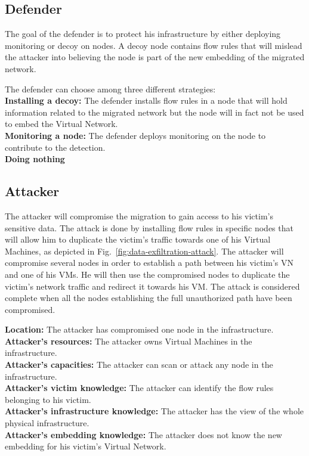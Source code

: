 \subsection{Defender}
The goal of the defender is to protect his infrastructure by either deploying monitoring or decoy on nodes. A decoy node contains flow rules that will mislead the attacker into believing the node is part of the new embedding of the migrated network.

The defender can choose among three different strategies:\\
\textbf{Installing a decoy: } The defender installs flow rules in a node that will hold information related to the migrated network but the node will in fact not be used to embed the Virtual Network.\\
\textbf{Monitoring a node: } The defender deploys monitoring on the node to contribute to the detection.\\
\textbf{Doing nothing}

\subsection{Attacker}
The attacker will compromise the migration to gain access to his victim's sensitive data.
The attack is done by installing flow rules in specific nodes that will allow him to duplicate the victim's traffic towards one of his Virtual Machines, as depicted in Fig.~\ref{fig:data-exfiltration-attack}. 
The attacker will compromise several nodes in order to establish a path between his victim's VN and one of his VMs.
He will then use the compromised nodes to duplicate the victim's network traffic and redirect it towards his VM.
The attack is considered complete when all the nodes establishing the full unauthorized path have been compromised.

\textbf{Location: } The attacker has compromised one node in the infrastructure.\\
\textbf{Attacker's resources: } The attacker owns Virtual Machines in the infrastructure.\\
\textbf{Attacker's capacities: } The attacker can scan or attack any node in the infrastructure.\\
\textbf{Attacker's victim knowledge: } The attacker can identify the flow rules belonging to his victim.\\
\textbf{Attacker's infrastructure knowledge: } The attacker has the view of the whole physical infrastructure.\\
\textbf{Attacker's embedding knowledge: } The attacker does not know the new embedding for his victim's Virtual Network.


